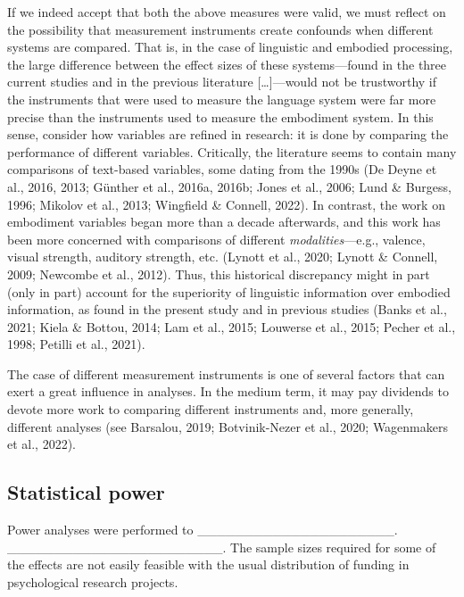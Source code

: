\documentclass[
  12pt,
  man,floatsintext]{apa7}
\begin{document}
If we indeed accept that both the above measures were valid, we must reflect on the possibility that measurement instruments create confounds when different systems are compared. That is, in the case of linguistic and embodied processing, the large difference between the effect sizes of these systems---found in the three current studies and in the previous literature {[}\ldots{]}---would not be trustworthy if the instruments that were used to measure the language system were far more precise than the instruments used to measure the embodiment system. In this sense, consider how variables are refined in research: it is done by comparing the performance of different variables. Critically, the literature seems to contain many comparisons of text-based variables, some dating from the 1990s (De Deyne et al., 2016, 2013; Günther et al., 2016a, 2016b; Jones et al., 2006; Lund \& Burgess, 1996; Mikolov et al., 2013; Wingfield \& Connell, 2022). In contrast, the work on embodiment variables began more than a decade afterwards, and this work has been more concerned with comparisons of different \emph{modalities}---e.g., valence, visual strength, auditory strength, etc. (Lynott et al., 2020; Lynott \& Connell, 2009; Newcombe et al., 2012). Thus, this historical discrepancy might in part (only in part) account for the superiority of linguistic information over embodied information, as found in the present study and in previous studies (Banks et al., 2021; Kiela \& Bottou, 2014; Lam et al., 2015; Louwerse et al., 2015; Pecher et al., 1998; Petilli et al., 2021).

The case of different measurement instruments is one of several factors that can exert a great influence in analyses. In the medium term, it may pay dividends to devote more work to comparing different instruments and, more generally, different analyses (see Barsalou, 2019; Botvinik-Nezer et al., 2020; Wagenmakers et al., 2022).

\hypertarget{statistical-power}{%
\subsection{Statistical power}\label{statistical-power}}

Power analyses were performed to \_\_\_\_\_\_\_\_\_\_\_\_\_\_\_\_\_\_\_\_\_. \_\_\_\_\_\_\_\_\_\_\_\_\_\_\_\_\_\_\_\_\_\_\_. The sample sizes required for some of the effects are not easily feasible with the usual distribution of funding in psychological research projects.

\clearpage
\end{document}
